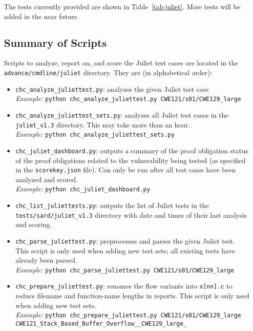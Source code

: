 \documentclass[11pt]{article}
\begin{document}
The tests currently provided are shown in Table~\ref{tab:juliet}. More tests will be
added in the near future.

\subsection{Summary of Scripts}

Scripts to analyze, report on, and score the Juliet test cases are located in the
{\tt advance/\-cmdline/\-juliet} directory. They are (in alphabetical order):

\begin{itemize}[leftmargin=*]
\item {\tt chc\_analyze\_juliettest.py}: analyzes the given Juliet test case \\
\emph{Example:} {\tt python chc\_analyze\_juliettest.py CWE121/s01/CWE129\_large}
\item {\tt chc\_analyze\_juliettest\_sets.py}: analyzes all Juliet test cases in the
   {\tt juliet\_v1.3} directory. This may take more than an hour.\\
\emph{Example:} {\tt python chc\_analyze\_juliettest\_sets.py}
\item {\tt chc\_juliet\_dashboard.py}: outputs a summary of the proof obligation status
   of the proof obligations related to the vulnerability being tested (as specified
   in the {\tt scorekey.json} file). Can only be run after all test cases have been
   analyzed and scored. \\
\emph{Example:} {\tt python chc\_juliet\_dashboard.py}
\item {\tt chc\_list\_juliettests.py}: outputs the list of Juliet tests in the
  {\tt tests/sard/juliet\_v1.3} directory with date and times of their last analysis
  and scoring.
\item {\tt chc\_parse\_juliettest.py}: preprocesses and parses the given Juliet test.
 This script is only used when adding new test sets; all existing tests have already
 been parsed. \\
\emph{Example:} {\tt python chc\_parse\_juliettest.py CWE121/s01/CWE129\_large}
\item {\tt chc\_prepare\_juliettest.py}: renames the flow variants into {\tt x[nn].c} to 
  reduce filename and function-name lengths in reports. This script is only used when
  adding new test sets.\\
\emph{Example:} {\tt python chc\_prepare\_juliettest.py CWE121/s01/CWE129\_large \\
   CWE121\_Stack\_Based\_Buffer\_Overflow\_\_CWE129\_large\_}

\end{itemize}
\end{document}

